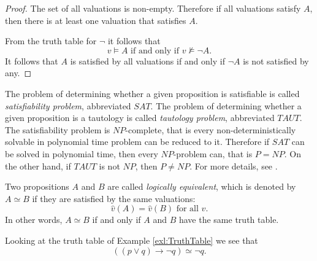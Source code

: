 \begin{page}

\begin{proof}
The set of all valuations is non-empty.
Therefore if all valuations satisfy $A$, then there is at least one valuation that satisfies $A$.

From the truth table for $\neg$ it follows that
\[
v \vDash A \text{ if and only if } v \nvDash \neg A.
\]
It follows that $A$ is satisfied by all valuations if and only if $\neg A$ is not satisfied by any.
\end{proof}

The problem of determining whether a given proposition is satisfiable is called \emph{satisfiability problem}, abbreviated $SAT$.
The problem of determining whether a given proposition is a tautology is called \emph{tautology problem}, abbreviated $TAUT$.
The satisfiability problem is $NP$-complete, that is every non-deterministically solvable in polynomial time problem can be reduced to it.
Therefore if $SAT$ can be solved in polynomial time, then every $NP$-problem can, that is $P=NP$.
On the other hand, if $TAUT$ is not $NP$, then $P \ne NP$.
For more details, see \cite[Section 3.3.5]{Gallier}.


\end{page}

\begin{page}

\begin{dfn}
\label{dfn:LogEqProp}
Two propositions $A$ and $B$ are called \emph{logically equivalent}, which is denoted by $A \simeq B$ if they are satisfied by the same valuations:
\[
\hat{v}(A) = \hat{v}(B) \text{ for all }v.
\]
In other words, $A \simeq B$ if and only if $A$ and $B$ have the same truth table.
\end{dfn}

\end{page}

\begin{page}

\begin{exl}
Looking at the truth table of Example \ref{exl:TruthTable} we see that
\[
((p \vee q) \to \neg q) \simeq \neg q.
\]
\end{exl}

\end{page}

